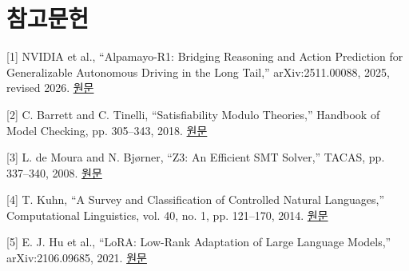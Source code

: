 \documentclass[11pt,a4paper]{article}
\begin{document}
\section*{참고문헌}

[1] NVIDIA et al., “Alpamayo-R1: Bridging Reasoning and Action Prediction for Generalizable Autonomous Driving in the Long Tail,” arXiv:2511.00088, 2025, revised 2026. \href{\detokenize{https://arxiv.org/abs/2511.00088}}{원문}\par

[2] C. Barrett and C. Tinelli, “Satisfiability Modulo Theories,” Handbook of Model Checking, pp. 305–343, 2018. \href{\detokenize{https://theory.stanford.edu/~barrett/pubs/BT18.pdf}}{원문}\par

[3] L. de Moura and N. Bjørner, “Z3: An Efficient SMT Solver,” TACAS, pp. 337–340, 2008. \href{\detokenize{https://doi.org/10.1007/978-3-540-78800-3_24}}{원문}\par

[4] T. Kuhn, “A Survey and Classification of Controlled Natural Languages,” Computational Linguistics, vol. 40, no. 1, pp. 121–170, 2014. \href{\detokenize{https://aclanthology.org/J14-1005/}}{원문}\par

[5] E. J. Hu et al., “LoRA: Low-Rank Adaptation of Large Language Models,” arXiv:2106.09685, 2021. \href{\detokenize{https://arxiv.org/abs/2106.09685}}{원문}\par
\end{document}
